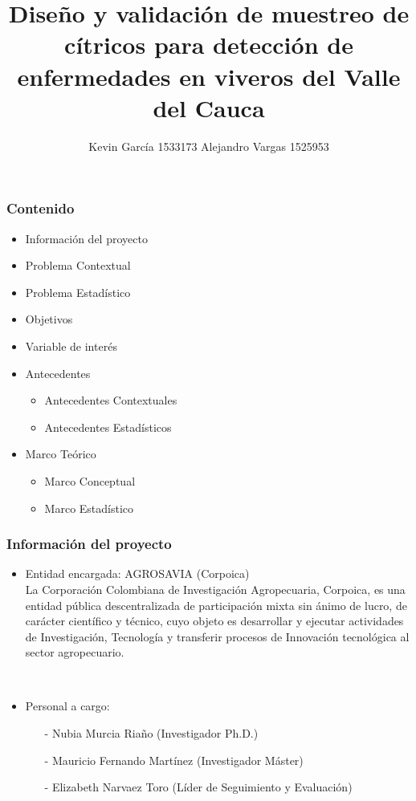 \documentclass[11pt]{beamer}
\author[Kevin García - Alejandro Vargas]{Kevin García 1533173 \newline Alejandro Vargas 1525953}
\title[Anteproyecto]{Diseño y validación de muestreo de cítricos para detección de enfermedades en viveros del Valle del Cauca}
\begin{document}
\justify
\begin{frame}
\titlepage
\end{frame}


\begin{frame}
\frametitle{Contenido}
\begin{itemize}
\item Información del proyecto
\item Problema Contextual
\item Problema Estadístico
\item Objetivos
\item Variable de interés
\item Antecedentes
\begin{itemize}
\item Antecedentes Contextuales
\item Antecedentes Estadísticos
\end{itemize}
\item Marco Teórico
\begin{itemize}
\item Marco Conceptual
\item Marco Estadístico
\end{itemize}
\end{itemize}
\end{frame}

\begin{frame}
\frametitle{Información del proyecto}
\begin{itemize}
\item Entidad encargada: AGROSAVIA (Corpoica)
~\\La Corporación Colombiana de Investigación Agropecuaria, Corpoica, es una entidad pública descentralizada de participación mixta sin ánimo de lucro, de carácter científico y técnico, cuyo objeto es desarrollar y ejecutar actividades de Investigación, Tecnología y transferir procesos de Innovación tecnológica al sector agropecuario.

~\\
\item Personal a cargo:
\begin{itemize}
\item[-]Nubia Murcia Riaño (Investigador Ph.D.)
\item[-]Mauricio Fernando Martínez (Investigador Máster)
\item[-]Elizabeth Narvaez Toro (Líder de Seguimiento y Evaluación)
\end{itemize}
\end{itemize}
\end{frame}
\end{document}
